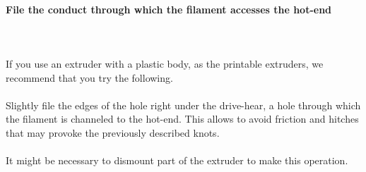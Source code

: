 \documentclass[11pt,a4paper]{article}
\begin{document}
			\paragraph{File the conduct through which the filament accesses the hot-end}\mbox{}\\\\
If you use an extruder with a plastic body, as the printable extruders, we recommend that you try the following. 
\\\\
Slightly file the edges of the hole right under the drive-hear, a hole through which the filament is channeled to the hot-end. This allows to avoid friction and hitches that may provoke the previously described knots. 
\\\\
It might be necessary to dismount part of the extruder to make this operation.
\end{document}
